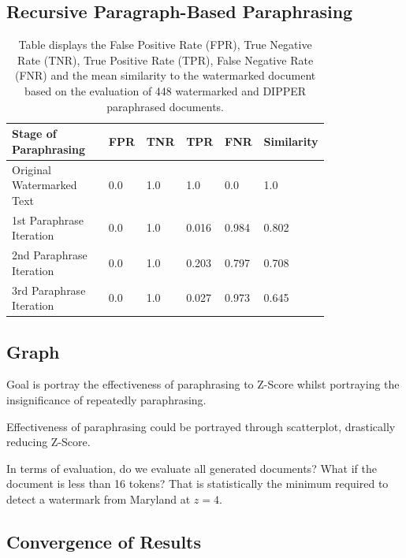 \documentclass{l4proj}
\theoremstyle{definition}
\begin{document}
    

    \subsection{Recursive Paragraph-Based Paraphrasing}
    
        \begin{table}[h]
            \centering
            \begin{tabular}{p{0.3\linewidth}|p{0.1\linewidth}|p{0.1\linewidth}|p{0.1\linewidth}|p{0.1\linewidth}|p{0.1\linewidth}}
                Stage of Paraphrasing & FPR & TNR & TPR & FNR & Similarity \\ \hline
                Original Watermarked Text & 0.0 & 1.0 & 1.0 & 0.0 & 1.0 \\
                1st Paraphrase Iteration & 0.0 & 1.0 & 0.016 & 0.984 & 0.802 \\
                2nd Paraphrase Iteration & 0.0 & 1.0 & 0.203 & 0.797 & 0.708 \\
                3rd Paraphrase Iteration & 0.0 & 1.0 & 0.027 & 0.973 & 0.645 \\ \hline
            \end{tabular}
            \captionsetup{width=\linewidth}
            \caption{Table displays the False Positive Rate (FPR), True Negative Rate (TNR), True Positive Rate (TPR), False Negative Rate (FNR) and the mean similarity to the watermarked document based on the evaluation of 448 watermarked and DIPPER paraphrased documents.}
            \label{table:paragraph-ratings}
        \end{table}

    \subsection{Graph}
    
        Goal is portray the effectiveness of paraphrasing to Z-Score whilst portraying the insignificance of repeatedly paraphrasing.

        Effectiveness of paraphrasing could be portrayed through scatterplot, drastically reducing Z-Score. \newline 

        In terms of evaluation, do we evaluate all generated documents? What if the document is less than 16 tokens? That is statistically the minimum required to detect a watermark from Maryland at $z = 4$.
    \subsection{Convergence of Results}
\end{document}
